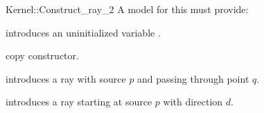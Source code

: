 \begin{ccRefFunctionObjectConcept}{Kernel::Construct_ray_2}
A model for this must provide:



\ccHidden {}
             {introduces an uninitialized variable .}

\ccHidden {}
            {copy constructor.}

            {introduces a ray  
             with source $p$ and passing through point $q$.}

            {introduces a ray  starting at source $p$ with 
             direction $d$.}

\end{ccRefFunctionObjectConcept}
